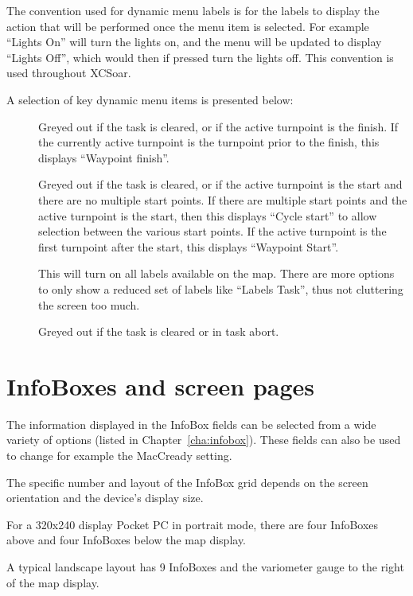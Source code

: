The convention used for dynamic menu labels is for the labels to display the
action that will be performed once the menu item is selected. For example
``Lights On'' will turn the lights on, and the menu will be updated to display
``Lights Off'', which would then if pressed turn the lights off. This
convention is used throughout XCSoar.

A selection of key dynamic menu items is presented below:
\begin{description}
\item[]
  Greyed out if the task is cleared, or if the active turnpoint is the
  finish. If the currently active turnpoint is the turnpoint prior to the
  finish, this displays  ``Waypoint finish''.
\item[]
  Greyed out if the task is cleared, or if the active turnpoint is the
  start and there are no multiple start points.  If there are multiple
  start points and the active turnpoint is the start, then this
  displays ``Cycle start'' to allow selection between the various
  start points.  If the active turnpoint is the first turnpoint after
  the start, this displays ``Waypoint Start''.
\item[]
  This will turn on all labels available on the map. There are more options to
  only show a reduced set of labels like ``Labels Task'', thus not cluttering the
  screen too much.
\item[]
  Greyed out if the task is cleared or in task abort.
\end{description}


\section{InfoBoxes and screen pages}

The information displayed in the InfoBox fields can be selected from a
wide variety of options (listed in Chapter~\ref{cha:infobox}). These
fields can also be used to change for example the MacCready setting.

The specific number and layout of the InfoBox grid depends on the
screen orientation and the device's display size.

For a 320x240 display
Pocket PC in portrait mode, there are four InfoBoxes above and four
InfoBoxes below the map display.

A typical landscape layout has 9 InfoBoxes and the variometer gauge
to the right of the map display.

